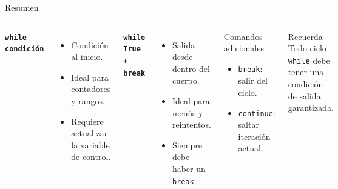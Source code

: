 \documentclass[aspectratio=169,xcolor=dvipsnames]{beamer}
\begin{document}
\begin{frame}{Resumen}
    \begin{columns}
        \textbf{\texttt{while condici\'on}}
        \begin{itemize}
            \item Condici\'on al inicio.
            \item Ideal para contadores y rangos.
            \item Requiere actualizar la variable de control.
        \end{itemize}
        \vspace{0.3cm}
        \textbf{\texttt{while True + break}}
        \begin{itemize}
            \item Salida desde dentro del cuerpo.
            \item Ideal para men\'us y reintentos.
            \item Siempre debe haber un \texttt{break}.
        \end{itemize}

        \begin{exampleblock}{Comandos adicionales}
            \begin{itemize}
                \item \texttt{break}: salir del ciclo.
                \item \texttt{continue}: saltar iteraci\'on actual.
            \end{itemize}
        \end{exampleblock}
        \vspace{0.3cm}
        \begin{alertblock}{Recuerda}
            Todo ciclo \texttt{while} debe tener
            una condici\'on de salida garantizada.
        \end{alertblock}
    \end{columns}
\end{frame}
\end{document}
